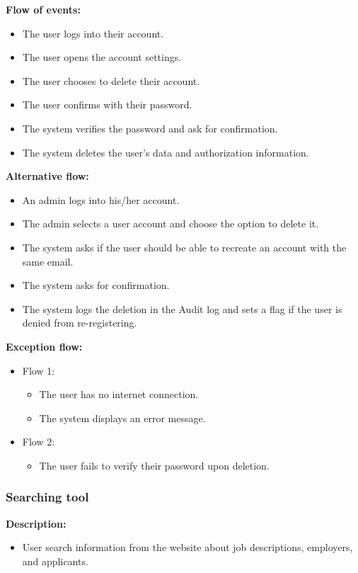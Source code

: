 \documentclass[a4paper]{article}
\begin{document}
        \textbf{Flow of events:}
        \begin{itemize}
            \item The user logs into their account.
            \item The user opens the account settings.
            \item The user chooses to delete their account.
            \item The user confirms with their password.
            \item The system verifies the password and ask for confirmation.
            \item The system deletes the user's data and authorization information.
        \end{itemize}

        \textbf{Alternative flow:}
        \begin{itemize}
            \item An admin logs into his/her account.
            \item The admin selects a user account and choose the option to delete it.
            \item The system asks if the user should be able to recreate an account with the same email.
            \item The system asks for confirmation.
            \item The system logs the deletion in the Audit log and sets a flag if the user is denied from re-registering.
        \end{itemize}

        \textbf{Exception flow:}
        \begin{itemize}
            \item Flow 1:
            \begin{itemize}
                \item The user has no internet connection.
                \item The system displays an error message.
            \end{itemize}
            \item Flow 2:
            \begin{itemize}
                \item The user fails to verify their password upon deletion.
            \end{itemize}
        \end{itemize}

        \subsubsection{Searching tool}
        \textbf{Description:}
        \begin{itemize}
            \item User search information from the website about job descriptions, employers, and applicants.
        \end{itemize}
\end{document}
